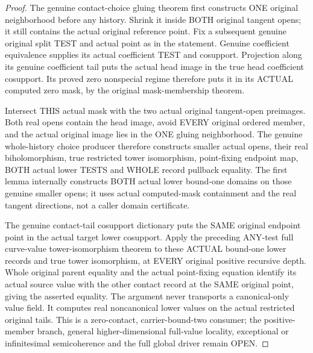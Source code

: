 \begin{proof}
The genuine contact-choice gluing theorem first constructs ONE original
neighborhood before any history. Shrink it inside BOTH original tangent
opens; it still contains the actual original reference point. Fix a
subsequent genuine original split TEST and actual point as in the
statement. Genuine coefficient equivalence supplies its actual coefficient
TEST and cosupport. Projection along its genuine coefficient tail puts
the actual head image in the true head coefficient cosupport. Its proved
zero nonspecial regime therefore puts it in its ACTUAL computed zero
mask, by the original mask-membership theorem.

Intersect THIS actual mask with the two actual original tangent-open
preimages. Both real opens contain the head image, avoid EVERY original
ordered member, and the actual original image lies in the ONE gluing
neighborhood. The genuine whole-history choice producer therefore
constructs smaller actual opens, their real biholomorphism, true restricted
tower isomorphism, point-fixing endpoint map, BOTH actual lower TESTS and
WHOLE record pullback equality. The first lemma internally constructs
BOTH actual lower bound-one domains on those genuine smaller opens; it
uses actual computed-mask containment and the real tangent directions,
not a caller domain certificate.

The genuine contact-tail cosupport dictionary puts the SAME original
endpoint point in the actual target lower cosupport. Apply the preceding
ANY-test full curve-value tower-isomorphism theorem to these ACTUAL
bound-one lower records and true tower isomorphism, at EVERY original
positive recursive depth. Whole original parent equality and the actual
point-fixing equation identify its actual source value with the other
contact record at the SAME original point, giving the asserted equality.
The argument never transports a canonical-only value field. It computes
real noncanonical lower values on the actual restricted original tails.
This is a zero-contact, carrier-bound-two consumer; the positive-member
branch, general higher-dimensional full-value locality, exceptional or
infinitesimal semicoherence and the full global driver remain OPEN.
\end{proof}
